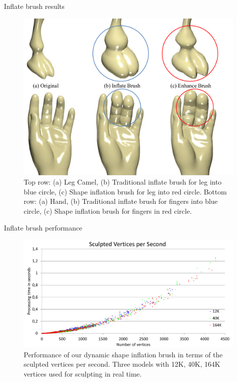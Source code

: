 \documentclass[10pt, compress, english]{beamer}
\begin{document}
\begin{frame}{Inflate brush results}


\begin{figure}
\includegraphics[height=0.5\textwidth]{img/sculpt_brush}

\protect\caption{Top row: (a) Leg Camel, (b) Traditional inflate brush for leg into
blue circle, (c) Shape inflation brush for leg into red circle. Bottom
row: (a) Hand, (b) Traditional inflate brush for fingers into blue
circle, (c) Shape inflation brush for fingers in red circle.}


\end{figure}


\end{frame}



\begin{frame}{Inflate brush performance}


\vspace{-10bp}


\begin{figure}
\hspace{-20bp}\includegraphics[height=0.7\textheight]{img/verts_per_second_sculpt}

\protect\caption{Performance of our dynamic shape inflation brush in terms of the sculpted
vertices per second. Three models with 12K, 40K, 164K vertices used
for sculpting in real time.}


\end{figure}


\end{frame}
\end{document}
